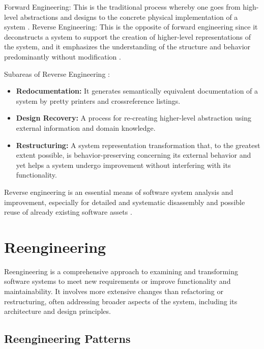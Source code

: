 Forward Engineering: This is the traditional process whereby one goes from high-level abstractions and designs to the concrete physical implementation of a system \cite{ReverseEngineering2005}.
Reverse Engineering: This is the opposite of forward engineering since it deconstructs a system to support the creation of higher-level representations of the system, and it emphasizes the understanding of the structure and behavior predominantly without modification \cite{ReverseEngineering2005} \cite{ReverseEngineering2011}.

Subareas of Reverse Engineering \cite{ReverseEngineering2011}: 
\begin{itemize}
  \item \textbf{Redocumentation:} It generates semantically equivalent documentation of a system by pretty printers and crossreference listings.
  
  \item \textbf{Design Recovery:} A process for re-creating higher-level abstraction using external information and domain knowledge.
  
  \item \textbf{Restructuring:} A system representation transformation that, to the greatest extent possible, is behavior-preserving concerning its external behavior and yet helps a system undergo improvement without interfering with its functionality.
\end{itemize}

Reverse engineering is an essential means of software system analysis and improvement, especially for detailed and systematic disassembly and possible reuse of already existing software assets \cite{ReverseEngineering1990}.



\section{Reengineering}

Reengineering is a comprehensive approach to examining and transforming software systems to meet new requirements or improve functionality and maintainability. It involves more extensive changes than refactoring or restructuring, often addressing broader aspects of the system, including its architecture and design principles.

\subsection{Reengineering Patterns}


